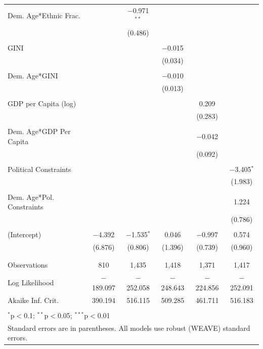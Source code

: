 \documentclass[a4paper]{article}\usepackage[]{graphicx}\usepackage[]{color}
\begin{document}
\begin{table}[H]
\begin{center}
{\begin{tabular}{@{\extracolsep{5pt}}lccccc}
 Dem. Age*Ethnic Frac. &  & $-$0.971$^{**}$ &  &  &  \\ 
  &  & (0.486) &  &  &  \\ 
  & & & & & \\ 
 GINI &  &  & $-$0.015 &  &  \\ 
  &  &  & (0.034) &  &  \\ 
  & & & & & \\ 
 Dem. Age*GINI &  &  & $-$0.010 &  &  \\ 
  &  &  & (0.013) &  &  \\ 
  & & & & & \\ 
 GDP per Capita (log) &  &  &  & 0.209 &  \\ 
  &  &  &  & (0.283) &  \\ 
  & & & & & \\ 
 Dem. Age*GDP Per Capita &  &  &  & $-$0.042 &  \\ 
  &  &  &  & (0.092) &  \\ 
  & & & & & \\ 
 Political Constraints &  &  &  &  & $-$3.405$^{*}$ \\ 
  &  &  &  &  & (1.983) \\ 
  & & & & & \\ 
 Dem. Age*Pol. Constraints &  &  &  &  & 1.224 \\ 
  &  &  &  &  & (0.786) \\ 
  & & & & & \\ 
 (Intercept) & $-$4.392 & $-$1.535$^{*}$ & 0.046 & $-$0.997 & 0.574 \\ 
  & (6.876) & (0.806) & (1.396) & (0.739) & (0.960) \\ 
  & & & & & \\ 
\hline \\[-1.8ex] 
Observations & 810 & 1,435 & 1,418 & 1,371 & 1,417 \\ 
Log Likelihood & $-$189.097 & $-$252.058 & $-$248.643 & $-$224.856 & $-$252.091 \\ 
Akaike Inf. Crit. & 390.194 & 516.115 & 509.285 & 461.711 & 516.183 \\ 
\hline 
\hline \\[-1.8ex] 
\multicolumn{6}{l}{$^{*}$p$<$0.1; $^{**}$p$<$0.05; $^{***}$p$<$0.01} \\ 
\multicolumn{6}{l}{Standard errors are in parentheses. All models use robust (WEAVE) standard errors.} \\ 
\end{tabular} 

    }
    \end{center}
\end{table}
\end{document}
